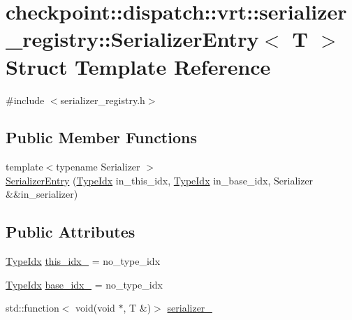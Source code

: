 \hypertarget{structcheckpoint_1_1dispatch_1_1vrt_1_1serializer__registry_1_1_serializer_entry}{}\section{checkpoint\+:\+:dispatch\+:\+:vrt\+:\+:serializer\+\_\+registry\+:\+:Serializer\+Entry$<$ T $>$ Struct Template Reference}
\label{structcheckpoint_1_1dispatch_1_1vrt_1_1serializer__registry_1_1_serializer_entry}


{\ttfamily \#include $<$serializer\+\_\+registry.\+h$>$}

\subsection*{Public Member Functions}
\begin{DoxyCompactItemize}
\item 
{\footnotesize template$<$typename Serializer $>$ }\\\hyperlink{structcheckpoint_1_1dispatch_1_1vrt_1_1serializer__registry_1_1_serializer_entry_acdb6f6442c02582096acab08ea25a0a8}{Serializer\+Entry} (\hyperlink{namespacecheckpoint_1_1dispatch_1_1vrt_acd3f9e6b091bcfbc23dc35ea8ef45d3b}{Type\+Idx} in\+\_\+this\+\_\+idx, \hyperlink{namespacecheckpoint_1_1dispatch_1_1vrt_acd3f9e6b091bcfbc23dc35ea8ef45d3b}{Type\+Idx} in\+\_\+base\+\_\+idx, Serializer \&\&in\+\_\+serializer)
\end{DoxyCompactItemize}
\subsection*{Public Attributes}
\begin{DoxyCompactItemize}
\item 
\hyperlink{namespacecheckpoint_1_1dispatch_1_1vrt_acd3f9e6b091bcfbc23dc35ea8ef45d3b}{Type\+Idx} \hyperlink{structcheckpoint_1_1dispatch_1_1vrt_1_1serializer__registry_1_1_serializer_entry_a0fc5b0685579bc7a19343c03c4062e77}{this\+\_\+idx\+\_\+} = no\+\_\+type\+\_\+idx
\item 
\hyperlink{namespacecheckpoint_1_1dispatch_1_1vrt_acd3f9e6b091bcfbc23dc35ea8ef45d3b}{Type\+Idx} \hyperlink{structcheckpoint_1_1dispatch_1_1vrt_1_1serializer__registry_1_1_serializer_entry_a03d02cc3c3685644c5a784bf21241105}{base\+\_\+idx\+\_\+} = no\+\_\+type\+\_\+idx
\item 
std\+::function$<$ void(void $\ast$, T \&)$>$ \hyperlink{structcheckpoint_1_1dispatch_1_1vrt_1_1serializer__registry_1_1_serializer_entry_a964df1472ba3ce4732531609f448206d}{serializer\+\_\+}
\end{DoxyCompactItemize}


